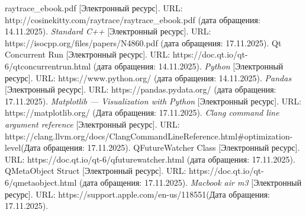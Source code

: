 \begin{thebibliography}{}
	 raytrace\_ebook.pdf [Электронный ресурс]. URL: http://cosinekitty.com/raytrace/raytrace\_ebook.pdf (дата обращения: 14.11.2025).
	\textit {Standard C++} [Электронный ресурс]. URL: 
	https://isocpp.org/files/papers/N4860.pdf (дата обращения: 17.11.2025).
	 Qt Concurrent Run [Электронный ресурс]. URL: https://doc.qt.io/qt-6/qtconcurrentrun.html (дата обращения: 14.11.2025).
	\textit {Python} [Электронный ресурс]. URL: https://www.python.org/ (дата обращения: 14.11.2025).
	\textit {Pandas} [Электронный ресурс]. URL: https://pandas.pydata.org/ (дата обращения: 17.11.2025).
	\textit {Matplotlib --- Visualization with Python} [Электронный ресурс]. URL:  https://matplotlib.org/ (Дата обращения: 17.11.2025).
	\textit {Clang command line argument reference} [Электронный ресурс]. URL: https://clang.llvm.org/docs/ClangCommandLineReference.html\#optimization-level(Дата обращения: 17.11.2025).
	 QFutureWatcher Class [Электронный ресурс]. URL: https://doc.qt.io/qt-6/qfuturewatcher.html (дата обращения: 17.11.2025).
	 QMetaObject Struct [Электронный ресурс]. URL: https://doc.qt.io/qt-6/qmetaobject.html (дата обращения: 17.11.2025).
	\textit {Macbook air m3} [Электронный ресурс]. URL: https://support.apple.com/en-us/118551(Дата обращения: 17.11.2025).
	
\end{thebibliography}

